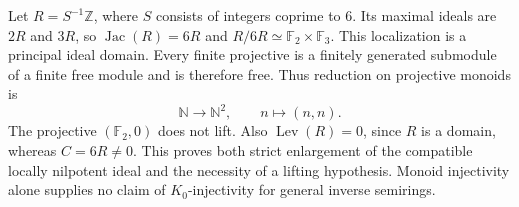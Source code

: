 \begin{example}
\label{ex:jacobson-lifting-boundary}
Let $R=S^{-1}\mathbb Z$, where $S$ consists of integers coprime
to $6$. Its maximal ideals are $2R$ and $3R$, so
$\operatorname{Jac}(R)=6R$ and
$R/6R\simeq\mathbb F_2\times\mathbb F_3$.
This localization is a principal ideal domain. Every finite
projective is a finitely generated submodule of a finite free
module and is therefore free. Thus reduction on projective
monoids is
\[
 \mathbb N\longrightarrow\mathbb N^2,\qquad n\longmapsto(n,n).
\]
The projective $(\mathbb F_2,0)$ does not lift. Also
$\operatorname{Lev}(R)=0$, since $R$ is a domain, whereas
$C=6R\ne0$. This proves both strict enlargement of the compatible
locally nilpotent ideal and the necessity of a lifting hypothesis.
Monoid injectivity alone supplies no claim of $K_0$-injectivity
for general inverse semirings.
\end{example}

